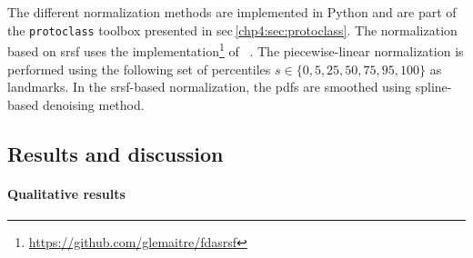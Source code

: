 The different normalization methods are implemented in Python and are part of the \texttt{protoclass} toolbox presented in \acs{sec}\,\ref{chp4:sec:protoclass}.
The normalization based on \ac{srsf} uses the implementation\footnote{\url{https://github.com/glemaitre/fdasrsf}} of \citeauthor{Tucker2013}~\cite{Tucker2013}.
The piecewise-linear normalization is performed using the following set of percentiles $s \in \{0, 5, 25, 50, 75, 95, 100 \}$ as landmarks.
In the \ac{srsf}-based normalization, the \acp{pdf} are smoothed using spline-based denoising method.

\subsection{Results and discussion}

\paragraph{Qualitative results}


